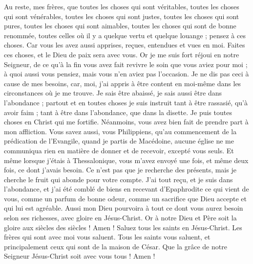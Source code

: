 \begin{multicols}{2}
 Au reste, mes frères, que toutes les choses qui sont véritables, toutes les choses qui sont vénérables, toutes les choses qui sont justes, toutes les choses qui sont pures, toutes les choses qui sont aimables, toutes les choses qui sont de bonne renommée, toutes celles où il y a quelque vertu et quelque louange ; pensez à ces choses.
Car vous les avez aussi apprises, reçues, entendues et vues en moi. Faites ces choses, et le Dieu de paix sera avec vous. 
Or je me suis fort réjoui en notre Seigneur, de ce qu'à la fin vous avez fait revivre le soin que vous aviez pour moi ; à quoi aussi vous pensiez, mais vous n'en aviez pas l'occasion. 
Je ne dis pas ceci à cause de mes besoins, car, moi, j'ai appris à être content en moi-même dans les circonstances où je me trouve.
Je sais être abaissé, je sais aussi être dans l'abondance ; partout et en toutes choses je suis instruit tant à être rassasié, qu'à avoir faim ; tant à être dans l'abondance, que dans la disette.
Je puis toutes choses en Christ qui me fortifie.
Néanmoins, vous avez bien fait de prendre part à mon affliction.
Vous savez aussi, vous Philippiens, qu'au commencement de la prédication de l'Evangile, quand je partis de Macédoine, aucune église ne me communiqua rien en matière de donner et de recevoir, excepté vous seuls. 
Et même lorsque j'étais à Thessalonique, vous m'avez envoyé une fois, et même deux fois, ce dont j'avais besoin. 
Ce n'est pas que je recherche des présents, mais je cherche le fruit qui abonde pour votre compte.
J'ai tout reçu, et je suis dans l'abondance, et j'ai été comblé de biens en recevant d'Epaphrodite ce qui vient de vous, comme un parfum de bonne odeur, comme un sacrifice que Dieu accepte et qui lui est agréable.
Aussi mon Dieu pourvoira à tout ce dont vous aurez besoin selon ses richesses, avec gloire en Jésus-Christ. 
Or à notre Dieu et Père soit la gloire aux siècles des siècles ! Amen !
Saluez tous les saints en Jésus-Christ. Les frères qui sont avec moi vous saluent.
Tous les saints vous saluent, et principalement ceux qui sont de la maison de César.
Que la grâce de notre Seigneur Jésus-Christ soit avec vous tous ! Amen !
\PPE{}
\end{multicols}
